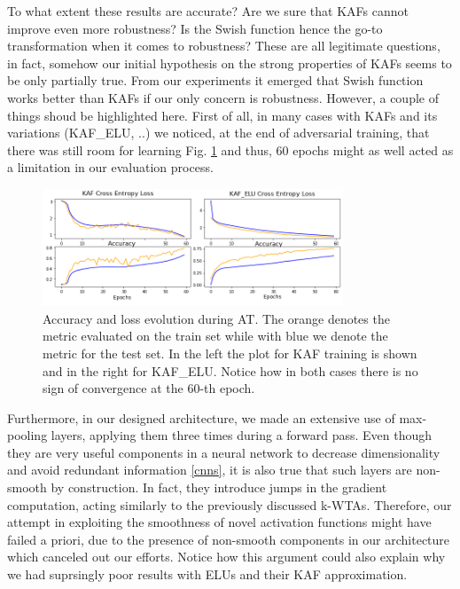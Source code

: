 \documentclass[LaM,binding=0.6cm]{./packages/sapthesis/sapthesis}
\begin{document}
        To what extent these results are accurate? Are we sure that KAFs cannot improve even more robustness?
        Is the Swish function hence the go-to transformation when it comes to robustness? These are all 
        legitimate questions, in fact, somehow our initial hypothesis on the strong properties of KAFs seems
        to be only partially true. From our experiments it emerged that Swish function works better than KAFs
        if our only concern is robustness. However, a couple of things shoud be highlighted here. First of all, 
        in many cases with KAFs and its variations (KAF\_ELU, ..) we noticed, at the end of adversarial 
        training, that there was still room for learning Fig. \ref{fig:vgghistory} and thus, 60 epochs might as well 
        acted as a limitation in our evaluation process. 
        \begin{figure}[h!]
            \centering
            \includegraphics[width=0.8\textwidth]{historyvgg.png}
            \caption{Accuracy and loss evolution during AT. The orange denotes the metric evaluated on the 
            train set while with blue we denote the metric for the test set. In the left the plot for 
            KAF training is shown and in the right for KAF\_ELU. Notice how in both cases there is 
            no sign of convergence at the 60-th epoch.}
            \label{fig:vgghistory}
        \end{figure}
        Furthermore, in our designed architecture,
        we made an extensive use of max-pooling layers, applying them three times during a forward pass. 
        Even though they are very useful components in a neural network to decrease dimensionality and 
        avoid redundant information \ref{cnns}, it is also true that such layers are non-smooth by construction.
        In fact, they introduce jumps in the gradient computation, acting similarly to the previously 
        discussed k-WTAs. Therefore, our attempt in exploiting the smoothness of novel activation functions 
        might have failed a priori, due to the presence of non-smooth components in our architecture which 
        canceled out our efforts. Notice how this argument could also explain why we had suprsingly poor 
        results with ELUs and their KAF approximation.
\end{document}
